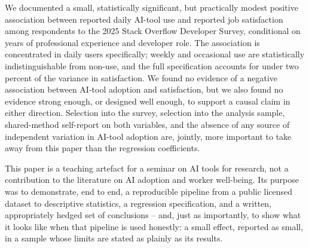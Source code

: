 \documentclass[11pt]{article}
\begin{document}
We documented a small, statistically significant, but practically modest
positive association between reported daily AI-tool use and reported job
satisfaction among respondents to the 2025 Stack Overflow Developer Survey,
conditional on years of professional experience and developer role. The
association is concentrated in daily users specifically; weekly and
occasional use are statistically indistinguishable from non-use, and the
full specification accounts for under two percent of the variance in
satisfaction. We found no evidence of a negative association between
AI-tool adoption and satisfaction, but we also found no evidence strong
enough, or designed well enough, to support a causal claim in either
direction. Selection into the survey, selection into the analysis sample,
shared-method self-report on both variables, and the absence of any
source of independent variation in AI-tool adoption are, jointly, more
important to take away from this paper than the regression coefficients.

This paper is a teaching artefact for a seminar on AI tools for research,
not a contribution to the literature on AI adoption and worker well-being.
Its purpose was to demonstrate, end to end, a reproducible pipeline from a
public licensed dataset to descriptive statistics, a regression
specification, and a written, appropriately hedged set of conclusions --
and, just as importantly, to show what it looks like when that pipeline is
used honestly: a small effect, reported as small, in a sample whose limits
are stated as plainly as its results.



\end{document}
